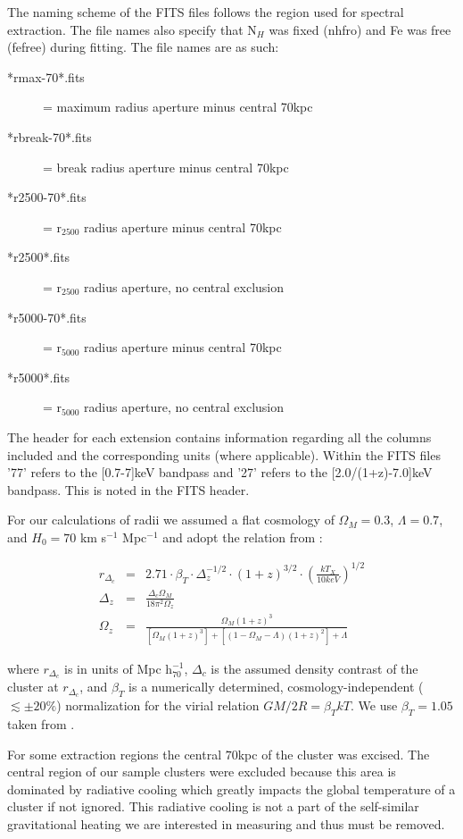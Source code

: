 \documentclass[preprint]{aastex}
\begin{document}
The naming scheme of the FITS files follows the region used for
spectral extraction. The file names also specify that N$_H$ was fixed (nhfro)
and Fe was free (fefree) during fitting. The file names are as such:
\begin{description}
\item[*rmax-70*.fits] = maximum radius aperture minus central 70kpc
\item[*rbreak-70*.fits] = break radius aperture minus central 70kpc
\item[*r2500-70*.fits] = r$_{2500}$ radius aperture minus central 70kpc
\item[*r2500*.fits] = r$_{2500}$ radius aperture, no central exclusion
\item[*r5000-70*.fits] = r$_{5000}$ radius aperture minus central 70kpc
\item[*r5000*.fits] = r$_{5000}$ radius aperture, no central exclusion
\end{description}

The header for each extension contains information regarding all the
columns included and the corresponding units (where
applicable). Within the FITS files '77' refers to the [0.7-7]keV
bandpass and '27' refers to the [2.0/(1+z)-7.0]keV bandpass. This is
noted in the FITS header.

For our calculations of radii we assumed a flat cosmology of
$\Omega_{M} = 0.3$, $\Lambda = 0.7$, and $H_{0} = 70$ km s$^{-1}$ Mpc$^{-1}$
and adopt the relation from \cite{2002A&A...389....1A}:

\begin{eqnarray}
r_{\Delta_c} &=& 2.71
\cdot \beta_T
\cdot \Delta_z^{-1/2}
\cdot (1+z)^{3/2}
\cdot (\frac{kT_X}{10keV})^{1/2}\\
\Delta_z &=& \frac{\Delta_c \Omega_M}{18\pi^2\Omega_z} \nonumber \\
\Omega_z &=& \frac{\Omega_M (1+z)^3}{[\Omega_M (1+z)^3]+[(1-\Omega_M-\Lambda)(1+z)^2]+\Lambda} \nonumber
\end{eqnarray}

where $r_{\Delta_c}$ is in units of Mpc h$_{70}^{-1}$, $\Delta_c$ is
the assumed density contrast of the cluster at $r_{\Delta_c}$, and
$\beta_T$ is a numerically determined, cosmology-independent ($\lesssim \pm 20\%$)
normalization for the virial relation
$GM/2R = \beta_TkT$. We use $\beta_T = 1.05$ taken from \cite{1996ApJ...469..494E}.

For some extraction regions the central $70$kpc of the cluster was
excised. The central region of our sample
clusters were excluded because this area is dominated by radiative cooling which
greatly impacts the global temperature of a cluster if not
ignored. This radiative cooling is not a part of the self-similar
gravitational heating we are interested in measuring and thus must be
removed.
\end{document}

